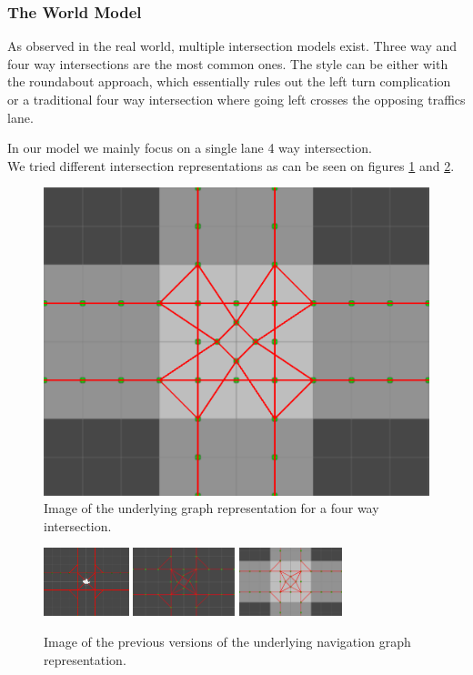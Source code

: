 \subsubsection{The World Model}
As observed in the real world, multiple intersection models exist. Three way and four way intersections are the most common ones.
The style can be either with the roundabout approach, which essentially rules out the left turn complication or a traditional four way intersection where going left crosses the opposing traffics lane.

In our model we mainly focus on a single lane 4 way intersection.\\ We tried different intersection representations as can be seen on figures \ref{figure:graph} and \ref{figure:graphs}.

\begin{figure}
\centering
\includegraphics[scale=.4]{img/graph.png}
\caption{Image of the underlying graph representation for a four way intersection.}
\label{figure:graph}
\end{figure}

\begin{figure}
\centering
\includegraphics[height=75px]{img/graph-old1.png}
\includegraphics[height=75px]{img/graph-old2.png}
\includegraphics[height=75px]{img/graph-old3.png}
\caption{Image of the previous versions of the underlying navigation graph representation.}
\label{figure:graphs}
\end{figure}

